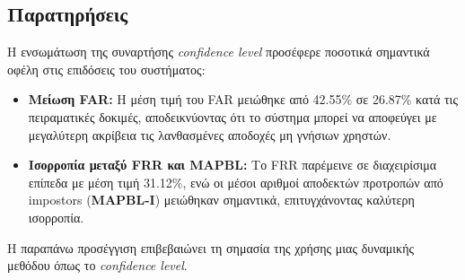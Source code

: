 \subsection{Παρατηρήσεις}
Η ενσωμάτωση της συναρτήσης \textit{confidence level} προσέφερε ποσοτικά σημαντικά οφέλη στις επιδόσεις του συστήματος:
\begin{itemize}
    \item \textbf{Μείωση FAR:} Η μέση τιμή του FAR μειώθηκε από 42.55\% σε 26.87\% κατά τις πειραματικές δοκιμές, αποδεικνύοντας ότι το σύστημα μπορεί να αποφεύγει με μεγαλύτερη ακρίβεια τις λανθασμένες αποδοχές μη γνήσιων χρηστών.
    \item \textbf{Ισορροπία μεταξύ FRR και MAPBL:} Το FRR παρέμεινε σε διαχειρίσιμα επίπεδα με μέση τιμή 31.12\%, ενώ οι μέσοι αριθμοί αποδεκτών προτροπών από impostors (\textbf{MAPBL-I}) μειώθηκαν σημαντικά, επιτυγχάνοντας καλύτερη ισορροπία.
\end{itemize}

Η παραπάνω προσέγγιση επιβεβαιώνει τη σημασία της χρήσης μιας δυναμικής μεθόδου όπως το \textit{confidence level}.

